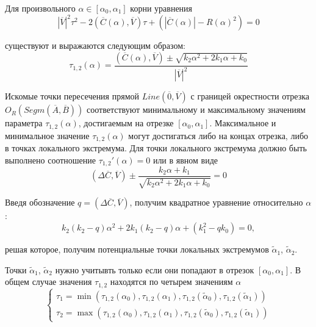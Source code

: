 Для произвольного $\alpha \in [\alpha_0, \alpha_1]$ корни уравнения
\begin{equation}
	|\overline{V}|^2 \tau^2 - 2(\overline{C}(\alpha), \overline{V}) \tau + \left( |\overline{C}(\alpha)| - R(\alpha)^2 \right) = 0
\end{equation}

существуют и выражаются следующим образом:
\begin{equation}
	\tau_{1,2}(\alpha) = \frac{(\overline{C}(\alpha), \overline{V}) \pm \sqrt{k_2 \alpha^2 + 2 k_1 \alpha + k_0}}{|\overline{V}|^2}
\end{equation}

Искомые точки пересечения прямой $Line(\overline{0}, \overline{V})$ с границей окрестности отрезка $O_R(Segm(\overline{A}, \overline{B}))$ соответствуют минимальному и максимальному значениям параметра $\tau_{1,2}(\alpha)$, достигаемым на отрезке $[\alpha_0, \alpha_1]$.
Максимальное и минимальное значение $\tau_{1,2}(\alpha)$ могут достигаться либо на концах отрезка, либо в точках локального экстремума.
Для точки локального экстремума должно быть выполнено соотношение $\tau_{1,2}'(\alpha) = 0$ или в явном виде
\begin{equation}
	(\Delta \overline{C}, \overline{V}) \pm \frac{k_2 \alpha + k_1}{ \sqrt{k_2 \alpha^2 + 2 k_1 \alpha + k_0} } = 0
\end{equation}

Введя обозначение $q = (\Delta \overline{C}, \overline{V})$, получим квадратное уравнение относительно $\alpha$:
\begin{equation}
	k_2 (k_2 - q) \alpha^2 + 2 k_1 (k_2 - q) \alpha + (k_1^2 - q k_0) = 0,
\end{equation}

решая которое, получим потенциальные точки локальных экстремумов $\tilde{\alpha}_1$, $\tilde{\alpha}_2$.

Точки $\tilde{\alpha}_1$, $\tilde{\alpha}_2$ нужно учитывть только если они попадают в отрезок $[\alpha_0, \alpha_1]$.
В общем случае значения $\tau_{1,2}$ находятся по четырем значениям $\alpha$
\begin{equation}
	\left\{
		\begin{aligned}
			\tau_1 = \min(\tau_{1,2}(\alpha_0), \tau_{1,2}(\alpha_1), \tau_{1,2}(\tilde{\alpha}_0), \tau_{1,2}(\tilde{\alpha}_1)) \\
			\tau_2 = \max(\tau_{1,2}(\alpha_0), \tau_{1,2}(\alpha_1), \tau_{1,2}(\tilde{\alpha}_0), \tau_{1,2}(\tilde{\alpha}_1))
		\end{aligned}
	\right.
\end{equation}

